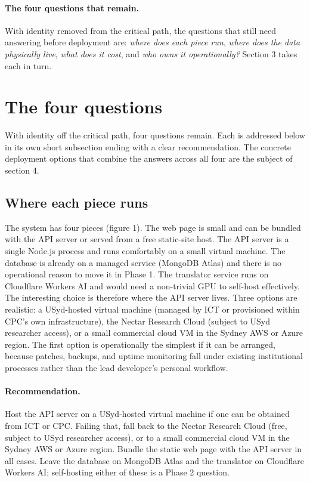 \documentclass[11pt,a4paper]{article}
\begin{document}
\paragraph{The four questions that remain.} With identity removed from the critical path, the questions that still need answering before deployment are: \emph{where does each piece run}, \emph{where does the data physically live}, \emph{what does it cost}, and \emph{who owns it operationally?} Section 3 takes each in turn.

\section{The four questions}

With identity off the critical path, four questions remain. Each is addressed below in its own short subsection ending with a clear recommendation. The concrete deployment options that combine the answers across all four are the subject of section 4.

\subsection{Where each piece runs}

The system has four pieces (figure 1). The web page is small and can be bundled with the API server or served from a free static-site host. The API server is a single Node.js process and runs comfortably on a small virtual machine. The database is already on a managed service (MongoDB Atlas) and there is no operational reason to move it in Phase 1. The translator service runs on Cloudflare Workers AI and would need a non-trivial GPU to self-host effectively. The interesting choice is therefore where the API server lives. Three options are realistic: a USyd-hosted virtual machine (managed by ICT or provisioned within CPC's own infrastructure), the Nectar Research Cloud (subject to USyd researcher access), or a small commercial cloud VM in the Sydney AWS or Azure region. The first option is operationally the simplest if it can be arranged, because patches, backups, and uptime monitoring fall under existing institutional processes rather than the lead developer's personal workflow.

\paragraph{Recommendation.} Host the API server on a USyd-hosted virtual machine if one can be obtained from ICT or CPC. Failing that, fall back to the Nectar Research Cloud (free, subject to USyd researcher access), or to a small commercial cloud VM in the Sydney AWS or Azure region. Bundle the static web page with the API server in all cases. Leave the database on MongoDB Atlas and the translator on Cloudflare Workers AI; self-hosting either of these is a Phase 2 question.
\end{document}
